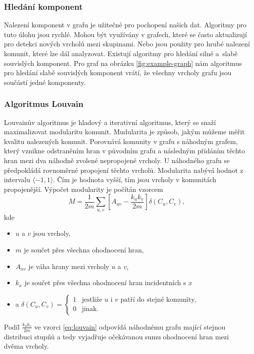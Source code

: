 \documentclass[
  program=infoi,
  biblatex=true,
  figures=true,
  glossaries=false,
  index,
  sourcecodes=true
]{kidiplom}
\begin{document}
\subsubsection{Hledání komponent}
Nalezení komponent v grafu je užitečné pro pochopení našich dat. Algoritmy pro tuto úlohu jsou rychlé. Mohou být využívány v grafech, které se často aktualizují pro detekci nových vrcholů mezi skupinami. Nebo jsou použity pro hrubé nalezení komunit, které lze dál analyzovat.  Existují algoritmy pro hledání silně a~slabě souvislých komponent. Pro graf na obrázku \ref{fig:example-graph} nám algoritmus pro hledání slabě souvislých komponent vrátí, že všechny vrcholy grafu jsou součástí jedné komponenty.

\subsubsection{Algoritmus Louvain}
Louvainův algoritmus\cite{louvain-original} je hladový a iterativní algoritmus, který se snaží maximalizovat modularitu komunit. Mudularita je způsob, jakým můžeme měřit kvalitu nalezených komunit. Porovnává komunity v grafu s náhodným grafem, který vznikne odstraněním hran v původním grafu a následným přidáním těchto hran mezi dva náhodně zvolené nepropojené vrcholy. U náhodného grafu se předpokládá rovnoměrné propojení těchto vrcholů. Modularita nabývá hodnot z intervalu $\langle -1, 1\rangle$. Čím je hodnota vyšší, tím jsou vrcholy v komunitách propojenější. Výpočet modularity je počítán vzorcem
\begin{equation} 
\label{eq:louvain}
M = \frac{1}{2m} \sum_{u,v} [A_{uv} - \frac{k_u k_v}{2m}] \delta (C_u, C_v),
\end{equation}
kde
\begin{itemize}
\item $u$ a $v$ jsou vrcholy,
\item $m$ je součet přes všechna ohodnocení hran,
\item $A_{uv}$ je váha hrany mezi vrcholy $u$ a $v$,
\item $k_x$ je součet přes všechna ohodnocení hran incidentních s $x$
\item a 
$
 \delta (C_u, C_v)=
    \begin{cases}
        1 & \text{jestliže } u \text{ i } v \text{ patří do stejné komunity,} \\
        0 & \text{jinak.}
    \end{cases}
$
\end{itemize}
Podíl $\frac{k_u k_v}{2m}$ ve vzorci \ref{eq:louvain} odpovídá náhodnému grafu mající stejnou distribuci stupňů a tedy vyjadřuje očekávanou sumu ohodnocení hran mezi dvěma vrcholy.
\end{document}
